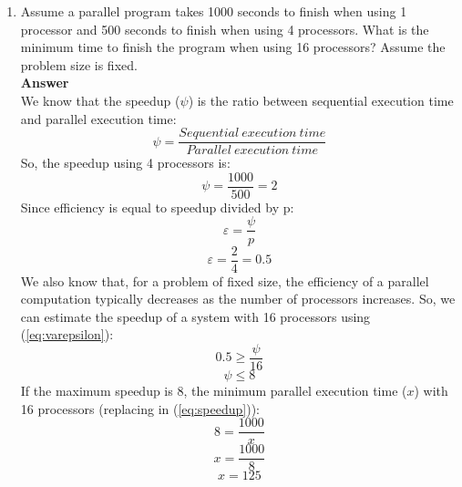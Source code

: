 \documentclass[10pt]{scrartcl}
\begin{document}
\begin{enumerate}
 \item Assume a parallel program takes 1000 seconds to finish when using 1 processor and 500 seconds to finish when using 4 processors. What is the minimum time to finish the program when using 16 processors? Assume the problem size is fixed.
 \\ 
 \textbf{Answer}
 \\
 We know that the speedup ($\psi$) is the ratio between sequential execution time and parallel execution time:
 \begin{equation}\label{eq:speedup}
  \psi = \frac{Sequential\ execution\ time}{Parallel\ execution\ time}
 \end{equation}
 So, the speedup using 4 processors is:
 $$ \psi = \frac{1000}{500} = 2 $$
 Since efficiency is equal to speedup divided by p:
 \begin{equation}\label{eq:varepsilon}
  \varepsilon = \frac{\psi}{p}
 \end{equation}
 $$ \varepsilon = \frac{2}{4} = 0.5 $$
 We also know that, for a problem of fixed size, the efficiency of a parallel computation typically decreases as the number of processors increases. 
 So, we can estimate the speedup of a system with 16 processors using (\ref{eq:varepsilon}):
 $$ 0.5 \geq \frac{\psi}{16} $$
 $$ \psi \leq 8 $$
 If the maximum speedup is 8, the minimum parallel execution time ($x$) with 16 processors (replacing in (\ref{eq:speedup})):
 $$ 8 = \frac{1000}{x} $$
 $$ x = \frac{1000}{8} $$
 $$ x = 125 $$


\end{enumerate}
\end{document}
